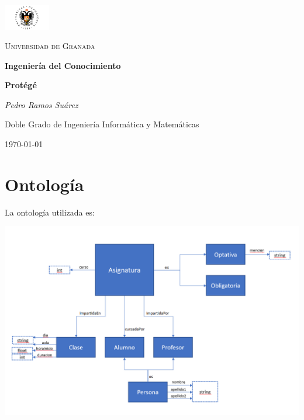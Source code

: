 \documentclass[11pt,a4paper]{article}
\begin{document}
\begin{titlepage}
\centering
\includegraphics[width=0.15\textwidth]{./UGR.png}\par\vspace{1cm}
{\scshape\LARGE Universidad de Granada \par}
\vspace{1cm}
\vspace{1.5cm}
{\huge\bfseries Ingeniería del Conocimiento\par}
\vspace{2cm}
{\LARGE\bfseries Protégé\par}
\vspace{2cm}
{\Large\itshape Pedro Ramos Suárez\par}
\vfill
Doble Grado de Ingeniería Informática y Matemáticas
\vfill
{\large \today\par}
\end{titlepage}

\newpage

\section*{Ontología}

La ontología utilizada es:
\begin{center}
\includegraphics[width=1\textwidth]{./ontonlogia.PNG}\par\vspace{1cm}
\end{center}
\end{document}
